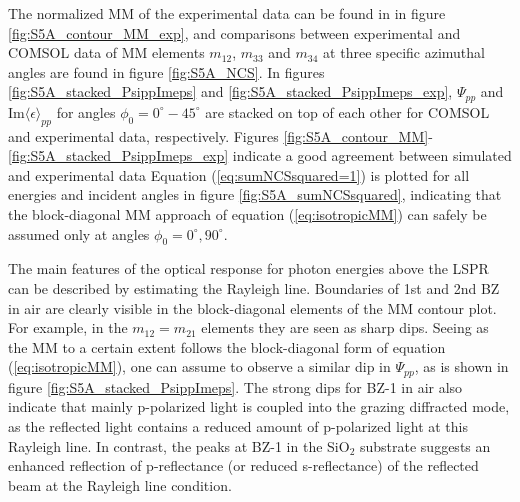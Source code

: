 The normalized MM of the experimental data can be found in in figure \ref{fig:S5A_contour_MM_exp}, and comparisons between experimental and COMSOL data of MM elements $m_{12}$, $m_{33}$ and $m_{34}$ at three specific azimuthal angles are found in figure \ref{fig:S5A_NCS}. In figures \ref{fig:S5A_stacked_PsippImeps} and \ref{fig:S5A_stacked_PsippImeps_exp}, $\Psi_{pp}$ and $\text{Im}\langle\epsilon\rangle_{pp}$ for angles $\phi_0=0^\circ-45^\circ$ are stacked on top of each other for COMSOL and experimental data, respectively. Figures \ref{fig:S5A_contour_MM}-\ref{fig:S5A_stacked_PsippImeps_exp} indicate a good agreement between simulated and experimental data  Equation (\ref{eq:sumNCSsquared=1}) is plotted for all energies and incident angles in figure \ref{fig:S5A_sumNCSsquared}, indicating that the block-diagonal MM approach of equation (\ref{eq:isotropicMM}) can safely be assumed only at angles $\phi_0=0^\circ, 90^\circ$. 

The main features of the optical response for photon energies above the LSPR can be described by estimating the Rayleigh line. Boundaries of 1st and 2nd BZ in air are clearly visible in the block-diagonal elements of the MM contour plot. For example, in the $m_{12}=m_{21}$ elements they are seen as sharp dips. Seeing as the MM to a certain extent follows the block-diagonal form of equation (\ref{eq:isotropicMM}), one can assume to observe a similar dip in $\Psi_{pp}$, as is shown in figure \ref{fig:S5A_stacked_PsippImeps}. The strong dips for BZ-1 in air also indicate that mainly p-polarized light is coupled into the grazing diffracted mode, as the reflected light contains a reduced amount of p-polarized light at this Rayleigh line. In contrast, the peaks at BZ-1 in the SiO$_2$ substrate suggests an enhanced reflection of p-reflectance (or reduced s-reflectance) of the reflected beam at the Rayleigh line condition.

